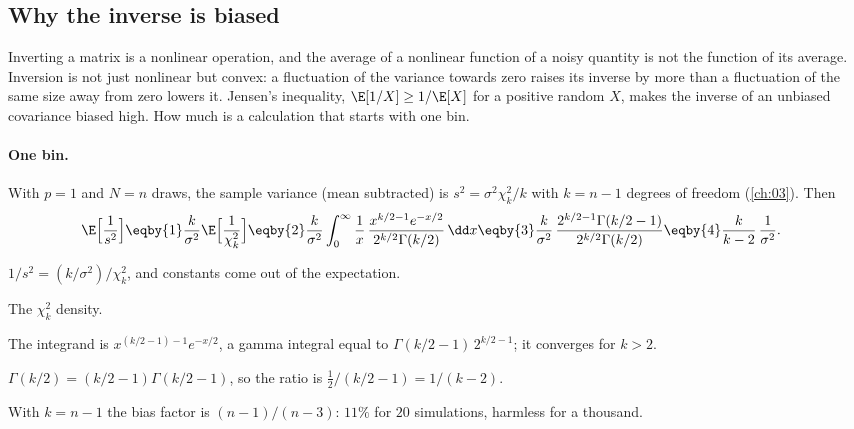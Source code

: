 \subsection{Why the inverse is biased}
\label{8b:sec:hartlap}

Inverting a matrix is a nonlinear operation, and the average of a nonlinear function of a noisy
quantity is not the function of its average. Inversion is not just nonlinear but convex: a
fluctuation of the variance towards zero raises its inverse by more than a fluctuation of the same
size away from zero lowers it. Jensen's inequality, $\E[1/X]\ge1/\E[X]$ for a positive random $X$, makes
the inverse of an unbiased covariance biased high. How much is a calculation that starts with one bin.

\paragraph{One bin.}
With $p=1$ and $N=n$ draws, the sample variance (mean subtracted) is $s^2=\sigma^2\chi^2_k/k$ with
$k=n-1$ degrees of freedom (\cref{ch:03}). Then
\begin{align}
  \E\Bigl[\frac1{s^2}\Bigr]
  &\eqby{1}\frac k{\sigma^2}\E\Bigl[\frac1{\chi^2_k}\Bigr]
   \eqby{2}\frac k{\sigma^2}\int_0^\infty\frac1x\,\frac{x^{k/2-1}e^{-x/2}}{2^{k/2}\Gamma(k/2)}\,\dd x
   \eqby{3}\frac k{\sigma^2}\,\frac{2^{k/2-1}\Gamma(k/2-1)}{2^{k/2}\Gamma(k/2)}
   \eqby{4}\frac{k}{k-2}\,\frac1{\sigma^2} .
  \label{8b:eq:inv-chi2}
\end{align}
\begin{explain}
  \item $1/s^2=(k/\sigma^2)/\chi^2_k$, and constants come out of the expectation.
  \item The $\chi^2_k$ density.
  \item The integrand is $x^{(k/2-1)-1}e^{-x/2}$, a gamma integral equal to $\Gamma(k/2-1)\,2^{k/2-1}$; it
        converges for $k>2$.
  \item $\Gamma(k/2)=(k/2-1)\Gamma(k/2-1)$, so the ratio is $\frac12/(k/2-1)=1/(k-2)$.
\end{explain}
With $k=n-1$ the bias factor is $(n-1)/(n-3)$: $11\%$ for $20$ simulations, harmless for a thousand.


